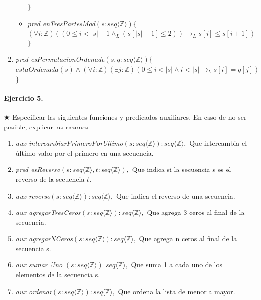 \documentclass[a4paper]{article}
\begin{document}
\begin{enumerate}[label=\alph*)]
\begin{itemize}
$\}$
\item \textit{pred enTresPartesMod}$(s: seq\langle \mathbb{Z} \rangle)\{$\\
\hspace*{6mm}$(\forall i:\mathbb{Z})((0\leq i<\vert s\vert -1 \wedge_L (s[\vert s \vert -1]\leq 2 ) )\rightarrow_L s[i]\leq s[i+1])$\\
$\}$
\end{itemize}
\item \textit{pred esPermutacionOrdenada}$(s,q: seq\langle \mathbb{Z} \rangle)\{$\\
\hspace*{6mm}$estaOrdenada(s)\wedge (\forall i:\mathbb{Z})(\exists j:\mathbb{Z})(0\leq i<\vert s\vert \wedge i<\vert s\vert\rightarrow_L s[i]= q[j])$\\
$\}$

\end{enumerate}

\paragraph{Ejercicio 5.} $\bigstar$ Especificar las siguientes funciones y predicados auxiliares. En caso de no ser posible, explicar las razones.
\begin{enumerate}[label=\alph*)]
\item \textit{aux intercambiarPrimeroPorUltimo}$(s: seq\langle \mathbb{Z} \rangle):seq\langle \mathbb{Z} \rangle,$ Que intercambia el último valor por el primero en una secuencia.
\item \textit{pred esReverso}$(s: seq\langle \mathbb{Z} \rangle , t:seq\langle \mathbb{Z} \rangle),$ Que indica si la secuencia $s$ es el reverso de la secuencia $t$.
\item \textit{aux reverso}$(s: seq\langle \mathbb{Z} \rangle):seq\langle \mathbb{Z} \rangle,$ Que indica el reverso de una secuencia.
\item \textit{aux agregarTresCeros}$(s: seq\langle \mathbb{Z} \rangle):seq\langle \mathbb{Z} \rangle,$ Que agrega 3 ceros al final de la secuencia.
\item \textit{aux agregarNCeros}$(s: seq\langle \mathbb{Z} \rangle):seq\langle \mathbb{Z} \rangle,$ Que agrega n ceros al final de la secuencia s.
\item \textit{aux sumar Uno} $(s: seq\langle \mathbb{Z} \rangle):seq\langle \mathbb{Z} \rangle,$ Que suma 1 a cada uno de los elementos de la secuencia s.
\item \textit{aux ordenar}$(s: seq\langle \mathbb{Z} \rangle):seq\langle \mathbb{Z} \rangle,$ Que ordena la lista de menor a mayor.
\end{enumerate}
\end{document}
